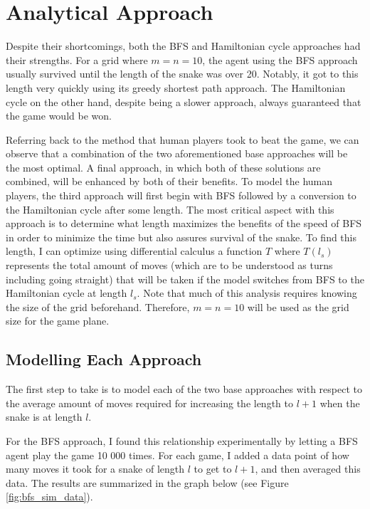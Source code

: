 \documentclass[12pt]{article}
\begin{document}
\section{Analytical Approach}

Despite their shortcomings, both the BFS and Hamiltonian cycle approaches had their strengths. For a grid where $m=n=10$, the agent using the BFS approach usually survived until the length of the snake was over 20. Notably, it got to this length very quickly using its greedy shortest path approach. The Hamiltonian cycle on the other hand, despite being a slower approach, always guaranteed that the game would be won.

Referring back to the method that human players took to beat the game, we can observe that a combination of the two aforementioned base approaches will be the most optimal. A final approach, in which both of these solutions are combined, will be enhanced by both of their benefits. To model the human players, the third approach will first begin with BFS followed by a conversion to the Hamiltonian cycle after some length. The most critical aspect with this approach is to determine what length maximizes the benefits of the speed of BFS in order to minimize the time but also assures survival of the snake. To find this length, I can optimize using differential calculus a function $T$  where $T(l_{s})$ represents the total amount of moves (which are to be understood as turns including going straight) that will be taken if the model switches from BFS to the Hamiltonian cycle at length $l_{s}$. Note that much of this analysis requires knowing the size of the grid beforehand. Therefore, $m=n=10$ will be used as the grid size for the game plane.

\subsection{Modelling Each Approach}

The first step to take is to model each of the two base approaches with respect to the average amount of moves required for increasing the length to $l+1$ when the snake is at length $l$.

For the BFS approach, I found this relationship experimentally by letting a BFS agent play the game 10 000 times. For each game, I added a data point of how many moves it took for a snake of length $l$ to get to $l+1$, and then averaged this data. The results are summarized in the graph below (see Figure \ref{fig:bfs_sim_data}).
\end{document}
